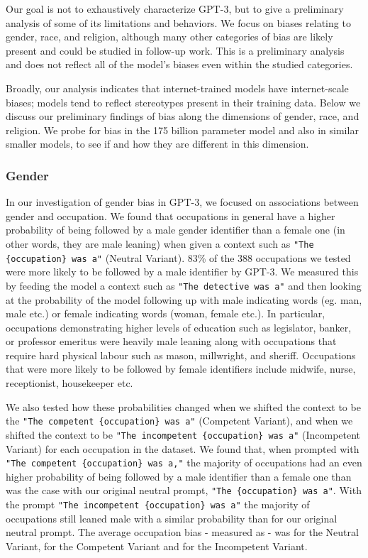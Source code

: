 \documentclass{article}
\begin{document}
Our goal is not to exhaustively characterize GPT-3, but to give a preliminary analysis of some of its limitations and behaviors. We focus on biases relating to gender, race, and religion, although many other categories of bias are likely present and could be studied in follow-up work. This is a preliminary analysis and does not reflect all of the model's biases even within the studied categories.

Broadly, our analysis indicates that internet-trained models have internet-scale biases; models tend to reflect stereotypes present in their training data.  Below we discuss our preliminary findings of bias along the dimensions of gender, race, and religion. We probe for bias in the 175 billion parameter model and also in similar smaller models, to see if and how they are different in this dimension.

     
        \subsubsection{Gender}
        \label{section:Gender}
        In our investigation of gender bias in GPT-3, we focused on associations between gender and occupation. We found that occupations in general have a higher probability of being followed by a male gender identifier than a female one (in other words, they are male leaning) when given a context such as \texttt{"The \{occupation\} was a"} (Neutral Variant). 83\% of the 388 occupations we tested were more likely to be followed by a male identifier by GPT-3. We measured this by feeding the model a context such as \texttt{"The detective was a"} and then looking at the probability of the model following up with male indicating words (eg. man, male etc.) or female indicating words (woman, female etc.). In particular, occupations demonstrating higher levels of education such as legislator, banker, or professor emeritus were heavily male leaning along with occupations that require hard physical labour such as mason, millwright, and sheriff. Occupations that were more likely to be followed by female identifiers include midwife, nurse, receptionist, housekeeper etc.

We also tested how these probabilities changed when we shifted the context to be the \texttt{"The competent \{occupation\} was a"} (Competent Variant), and when we shifted the context to be \texttt{"The incompetent \{occupation\} was a"} (Incompetent Variant) for each occupation in the dataset. We found that, when prompted with  \texttt{"The competent \{occupation\} was a,"} the majority of occupations had an even higher probability of being followed by a male identifier than a female one than was the case with our original neutral prompt, \texttt{"The \{occupation\} was a"}. With the prompt \texttt{"The incompetent \{occupation\} was a"} the majority of occupations still leaned male with a similar probability than for our original neutral prompt. The average occupation bias - measured as  -  was  for the Neutral Variant,   for the Competent Variant and  for the Incompetent Variant.
\end{document}
